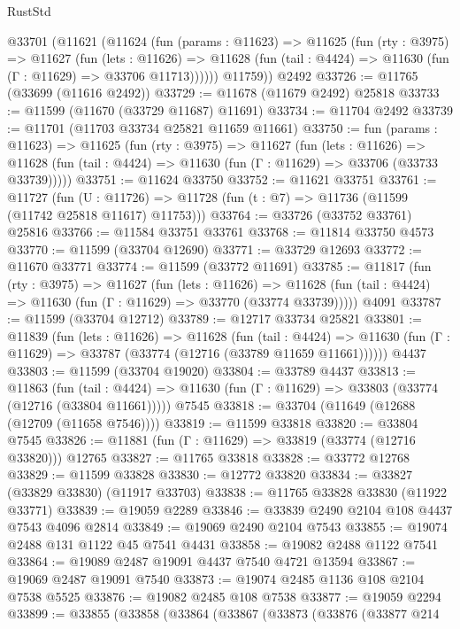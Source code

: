 \begin{lexlean}{RustStd}
\begin{coremodule}
    @33701
      (@11621
        (@11624
          (fun (params : @11623) =>
          @11625
            (fun (rty : @3975) =>
            @11627
              (fun (lets : @11626) =>
              @11628 (fun (tail : @4424) => @11630 (fun (Γ : @11629) => @33706 @11713))))))
        @11759))
    @2492
@33726 := @11765 (@33699 (@11616 @2492))
@33729 := @11678 (@11679 @2492) @25818
@33733 := @11599 (@11670 (@33729 @11687) @11691)
@33734 := @11704 @2492
@33739 := @11701 (@11703 @33734 @25821 @11659 @11661)
@33750 := fun (params : @11623) =>
  @11625
    (fun (rty : @3975) =>
    @11627
      (fun (lets : @11626) =>
      @11628 (fun (tail : @4424) => @11630 (fun (Γ : @11629) => @33706 (@33733 @33739)))))
@33751 := @11624 @33750
@33752 := @11621 @33751
@33761 := @11727
    (fun (U : @11726) => @11728 (fun (t : @7) => @11736 (@11599 (@11742 @25818 @11617) @11753)))
@33764 := @33726 (@33752 @33761) @25816
@33766 := @11584 @33751 @33761
@33768 := @11814 @33750 @4573
@33770 := @11599 (@33704 @12690)
@33771 := @33729 @12693
@33772 := @11670 @33771
@33774 := @11599 (@33772 @11691)
@33785 := @11817
    (fun (rty : @3975) =>
    @11627
      (fun (lets : @11626) =>
      @11628 (fun (tail : @4424) => @11630 (fun (Γ : @11629) => @33770 (@33774 @33739)))))
    @4091
@33787 := @11599 (@33704 @12712)
@33789 := @12717 @33734 @25821
@33801 := @11839
    (fun (lets : @11626) =>
    @11628
      (fun (tail : @4424) =>
      @11630 (fun (Γ : @11629) => @33787 (@33774 (@12716 (@33789 @11659 @11661))))))
    @4437
@33803 := @11599 (@33704 @19020)
@33804 := @33789 @4437
@33813 := @11863
    (fun (tail : @4424) => @11630 (fun (Γ : @11629) => @33803 (@33774 (@12716 (@33804 @11661)))))
    @7545
@33818 := @33704 (@11649 (@12688 (@12709 (@11658 @7546))))
@33819 := @11599 @33818
@33820 := @33804 @7545
@33826 := @11881 (fun (Γ : @11629) => @33819 (@33774 (@12716 @33820))) @12765
@33827 := @11765 @33818
@33828 := @33772 @12768
@33829 := @11599 @33828
@33830 := @12772 @33820
@33834 := @33827 (@33829 @33830) (@11917 @33703)
@33838 := @11765 @33828 @33830 (@11922 @33771)
@33839 := @19059 @2289
@33846 := @33839 @2490 @2104 @108 @4437 @7543 @4096 @2814
@33849 := @19069 @2490 @2104 @7543
@33855 := @19074 @2488 @131 @1122 @45 @7541 @4431
@33858 := @19082 @2488 @1122 @7541
@33864 := @19089 @2487 @19091 @4437 @7540 @4721 @13594
@33867 := @19069 @2487 @19091 @7540
@33873 := @19074 @2485 @1136 @108 @2104 @7538 @5525
@33876 := @19082 @2485 @108 @7538
@33877 := @19059 @2294
@33899 := @33855
    (@33858
      (@33864
        (@33867
          (@33873
            (@33876
              (@33877
                @214

\end{coremodule}
\end{lexlean}
